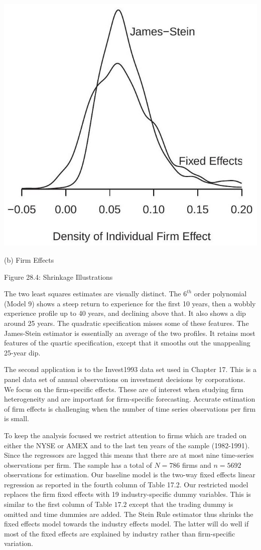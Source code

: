 \documentclass[10pt]{article}
\begin{document}
\includegraphics[max width=\textwidth]{2022_10_23_101d59f261a704807a3bg-33(1)}

(b) Firm Effects

Figure 28.4: Shrinkage Illustrations

The two least squares estimates are visually distinct. The $6^{t h}$ order polynomial (Model 9) shows a steep return to experience for the first 10 years, then a wobbly experience profile up to 40 years, and declining above that. It also shows a dip around 25 years. The quadratic specification misses some of these features. The James-Stein estimator is essentially an average of the two profiles. It retains most features of the quartic specification, except that it smooths out the unappealing 25-year dip.

The second application is to the Invest1993 data set used in Chapter 17. This is a panel data set of annual observations on investment decisions by corporations. We focus on the firm-specific effects. These are of interest when studying firm heterogeneity and are important for firm-specific forecasting. Accurate estimation of firm effects is challenging when the number of time series observations per firm is small.

To keep the analysis focused we restrict attention to firms which are traded on either the NYSE or AMEX and to the last ten years of the sample (1982-1991). Since the regressors are lagged this means that there are at most nine time-series observations per firm. The sample has a total of $N=786$ firms and $n=5692$ observations for estimation. Our baseline model is the two-way fixed effects linear regression as reported in the fourth column of Table 17.2. Our restricted model replaces the firm fixed effects with 19 industry-specific dummy variables. This is similar to the first column of Table $17.2$ except that the trading dummy is omitted and time dummies are added. The Stein Rule estimator thus shrinks the fixed effects model towards the industry effects model. The latter will do well if most of the fixed effects are explained by industry rather than firm-specific variation.
\end{document}
